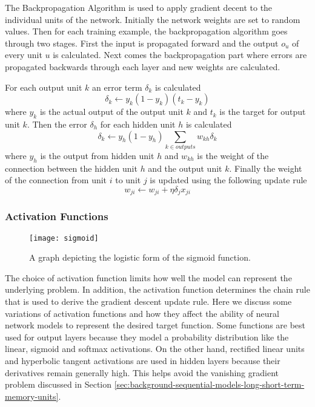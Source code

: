 The Backpropagation Algorithm is used to apply gradient decent to the individual units of the network\cite{Mitchell}. Initially the network weights are set to random values. Then for each training example, the backpropagation algorithm goes through two stages. First the input is propagated forward and the output $o_u$ of every unit $u$ is calculated. Next comes the backpropagation part where errors are propagated backwards through each layer and new weights are calculated.

For each output unit $k$ an error term $\delta_k$ is calculated
\begin{equation}
\delta_k \leftarrow y_k (1 - y_k)(t_k - y_k)
\end{equation}
where $y_k$ is the actual output of the output unit $k$ and $t_k$ is the target for output unit $k$. Then the error $\delta_h$ for each hidden unit $h$ is calculated
\begin{equation}
\delta_k \leftarrow y_h (1 - y_h) \sum_{k \in outputs} w_{kh} \delta_k
\end{equation}
where $y_h$ is the output from hidden unit $h$ and $w_{kh}$ is the weight of the connection between the hidden unit $h$ and the output unit $k$. Finally the weight of the connection from unit $i$ to unit $j$ is updated using the following update rule
\begin{equation}
w_{ji} \leftarrow w_{ji} + \eta \delta_j x_{ji}
\end{equation}

\subsubsection{Activation Functions}

\begin{figure}[t]
	\centering
	\texttt{[image: sigmoid]}
	\caption{A graph depicting the logistic form of the sigmoid function.}
	\label{fig:sigmoid}
\end{figure}

The choice of activation function limits how well the model can represent the underlying problem. In addition, the activation function determines the chain rule that is used to derive the gradient descent update rule. Here we discuss some variations of activation functions and how they affect the ability of neural network models to represent the desired target function. Some functions are best used for output layers because they model a probability distribution like the linear, sigmoid and softmax activations. On the other hand, rectified linear units and hyperbolic tangent activations are used in hidden layers because their derivatives remain generally high. This helps avoid the vanishing gradient problem discussed in Section \ref{sec:background-sequential-models-long-short-term-memory-units}\cite{Goodfellow-et-al-2016}.

